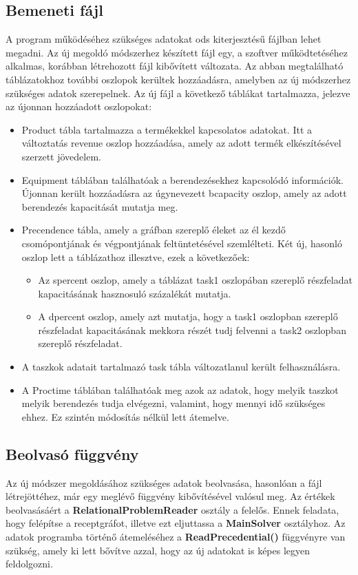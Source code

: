 \subsection{Bemeneti fájl}
A program működéséhez szükséges adatokat ods kiterjesztésű fájlban lehet megadni. Az új megoldó módszerhez készített fájl egy, a szoftver működtetéséhez alkalmas, korábban létrehozott fájl kibővített változata. Az abban megtalálható táblázatokhoz további oszlopok kerültek hozzáadásra, amelyben az új módszerhez szükséges adatok szerepelnek. Az új fájl a következő táblákat tartalmazza, jelezve az újonnan hozzáadott oszlopokat:
\begin{itemize}
  \item Product tábla tartalmazza a termékekkel kapcsolatos adatokat. Itt a változtatás revenue oszlop hozzáadása, amely az adott termék elkészítésével szerzett jövedelem.
  \item Equipment táblában találhatóak a berendezésekhez kapcsolódó információk. Újonnan került hozzáadásra az úgynevezett b\textunderscore capacity oszlop, amely az adott berendezés kapacitását mutatja meg.
  \item Precendence tábla, amely a gráfban szereplő éleket az él kezdő csomópontjának és végpontjának feltüntetésével szemlélteti. Két új, hasonló oszlop lett a táblázathoz illesztve, ezek a következőek:
  	\begin{itemize}
  		\item Az s\textunderscore percent oszlop, amely a táblázat task1 oszlopában szereplő részfeladat kapacitásának hasznosuló százalékát mutatja.
  		\item A d\textunderscore percent oszlop, amely azt mutatja, hogy a task1 oszlopban szereplő részfeladat kapacitásának mekkora részét tudj felvenni a task2 oszlopban szereplő részfeladat.
  	\end{itemize}
  	\item A taszkok adatait tartalmazó task tábla változatlanul került felhasználásra.
  	\item A Proctime táblában találhatóak meg azok az adatok, hogy melyik taszkot melyik berendezés tudja elvégezni, valamint, hogy mennyi idő szükséges ehhez. Ez szintén módosítás nélkül lett átemelve.
\end{itemize}
\subsection{Beolvasó függvény}
Az új módszer megoldásához szükséges adatok beolvasása, hasonlóan a fájl létrejöttéhez, már egy meglévő függvény kibővítésével valósul meg. Az értékek beolvasásáért a \textbf{RelationalProblemReader} osztály a felelős. Ennek feladata, hogy felépítse a receptgráfot, illetve ezt eljuttassa a \textbf{MainSolver} osztályhoz. Az adatok programba történő átemeléséhez a \textbf{ReadPrecedential()} függvényre van szükség, amely ki lett bővítve azzal, hogy az új adatokat is képes legyen feldolgozni. 

